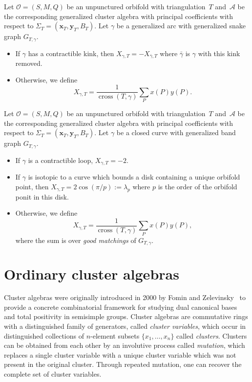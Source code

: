 \documentclass[11pt]{article}
\numberwithin{equation}{section}
\begin{document}
\begin{Definition}\label{def:genArc}
Let $\mathcal{O} = (S,M,Q)$ be an unpunctured orbifold with triangulation~$T$ and~$\mathcal{A}$ be the corresponding generalized cluster algebra with principal coefficients with respect to $\Sigma_T = (\mathbf{x}_T,\mathbf{y}_T,B_T)$. Let $\gamma$ be a generalized arc with generalized snake graph $G_{T,\gamma}$.
\begin{itemize}\itemsep=0pt
 \item If $\gamma$ has a contractible kink, then $X_{\gamma,T} = -X_{\bar{\gamma},T}$ where $\bar{\gamma}$ is $\gamma$ with this kink removed.
 \item Otherwise, we define \[X_{\gamma,T} = \frac{1}{\operatorname{cross}(T,\gamma)} \sum_P x(P)y(P). \]
\end{itemize}
\end{Definition}

\begin{Definition}\label{def:closedcurve}
Let $\mathcal{O} = (S,M,Q)$ be an unpunctured orbifold with triangulation~$T$ and~$\mathcal{A}$ be the corresponding generalized cluster algebra with principal coefficients with respect to $\Sigma_T = (\mathbf{x}_T,\mathbf{y}_T,B_T)$. Let $\gamma$ be a closed curve with generalized band graph $G_{T,\gamma}$.
\begin{itemize}\itemsep=0pt
 \item If $\gamma$ is a contractible loop, $X_{\gamma,T} = -2$.
 \item If $\gamma$ is isotopic to a curve which bounds a disk containing a unique orbifold point, then $X_{\gamma,T} = 2\cos(\pi/p):= \lambda_p$ where $p$ is the order of the orbifold ponit in this disk.
 \item Otherwise, we define \[X_{\gamma,T} = \frac{1}{\operatorname{cross}(T,\gamma)} \sum_P x(P)y(P), \]
 where the sum is over \emph{good matchings} of $G_{T,\gamma}$.
\end{itemize}
\end{Definition}

\setcounter{section}{1}
\setcounter{subsection}{0}
\setcounter{subsubsection}{0}
\setcounter{Theorem}{3}
\setcounter{equation}{0}
\section{Ordinary cluster algebras}\label{sec:ordinaryClusterAlgebras}

Cluster algebras were originally introduced in 2000 by Fomin and Zelevinsky~\cite{Fomin-Zelevinsky-I} to provide a concrete combinatorial framework for studying dual canonical bases and total positivity in semisimple groups. Cluster algebras are commutative rings with a distinguished family of ge\-nerators, called \emph{cluster variables}, which occur in distinguished collections of $n$-element subsets $\{x_1, \dots, x_n \}$ called \emph{clusters}. Clusters can be obtained from each other by an involutive process called \emph{mutation}, which replaces a single cluster variable with a unique cluster variable which was not present in the original cluster. Through repeated mutation, one can recover the complete set of cluster variables.
\end{document}
